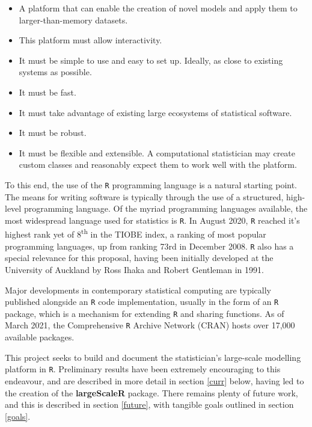 \begin{itemize}
        \item A platform that can enable the creation of novel models and apply them to larger-than-memory datasets.
        \item This platform must allow interactivity.
        \item It must be simple to use and easy to set up.
                Ideally, as close to existing systems as possible.
        \item It must be fast.
        \item It must take advantage of existing large ecosystems of statistical software.
        \item It must be robust.
        \item It must be flexible and extensible.
                A computational statistician may create custom classes and reasonably expect them to work well with the platform.
\end{itemize}

To this end, the use of the \texttt{R} programming language is a natural starting point.
The means for writing software is typically through the use of a structured, high-level programming language.
Of the myriad programming languages available, the most widespread language used for statistics is \texttt{R}.
In August 2020, \texttt{R} reached it's highest rank yet of 8\textsuperscript{th} in the TIOBE index, a ranking of most popular programming languages, up from ranking 73rd in December 2008\cite{tiobe2021r}.
\texttt{R} also has a special relevance for this proposal, having been initially developed at the University of Auckland by Ross Ihaka and Robert Gentleman in 1991\cite{ihaka1996r}.

Major developments in contemporary statistical computing are typically published alongside an \texttt{R} code implementation, usually in the form of an \texttt{R} package, which is a mechanism for extending \texttt{R} and sharing functions.
As of March 2021, the Comprehensive \texttt{R} Archive Network (CRAN) hosts over 17,000 available packages\cite{team20:_r}.

This project seeks to build and document the statistician's large-scale modelling platform in \texttt{R}.
Preliminary results have been extremely encouraging to this endeavour, and are described in more detail in section \ref{curr} below, having led to the creation of the \textbf{largeScaleR} package\cite{cairns2020largescaler}.
There remains plenty of future work, and this is described in section \ref{future}, with tangible goals outlined in section \ref{goals}.

